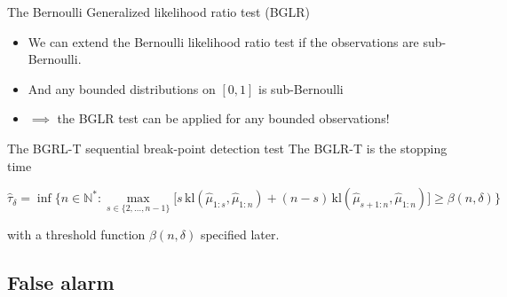 \documentclass[11pt,english,ignorenonframetext,]{beamer}
\begin{document}
\begin{frame}{The Bernoulli Generalized likelihood ratio test (BGLR)}

  \begin{itemize}
    \item
    We can extend the Bernoulli likelihood ratio test if the observations are \alert{sub-Bernoulli}.
    \item
    And any bounded distributions on $[0,1]$ is sub-Bernoulli
    \item
    $\implies$ the BGLR test can be applied for any bounded observations!
  \end{itemize}


  \pause

  \begin{block}{The BGRL-T sequential break-point detection test}
    The \alert{BGLR-T} is the stopping time
    \begin{small}
    \[ \widehat{\tau}_{\delta} = \inf \bigl\{ n \in \mathbb{N}^* : \max_{s \in \{2,\dots,n-1\}} \bigl[s \, \mathrm{kl}\left(\widehat{\mu}_{1:s},\widehat{\mu}_{1:n}\right) + (n-s) \, \mathrm{kl}\left(\widehat{\mu}_{s+1:n},\widehat{\mu}_{1:n}\right)\bigr] \geq \beta(n,\delta) \bigr\} \]
    \end{small}
    with a \alert{threshold function} $\beta(n,\delta)$ specified later.
  \end{block}

\end{frame}


\subsection{\hfill{}False alarm\hfill{}}
\end{document}
